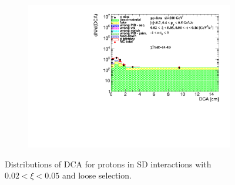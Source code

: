 \begin{figure}[h!]
\begin{subfigure}{.45\textwidth}
		\includegraphics[width=\linewidth, page=14]{chapters/chrgSTAR/img/DCAproton/background_p_0.pdf}
	\end{subfigure}
	\caption{Distributions of DCA for protons in SD interactions with $0.02 < \xi<0.05$ and loose selection.}
	\label{fig:dca_proton_0}
\end{figure}
